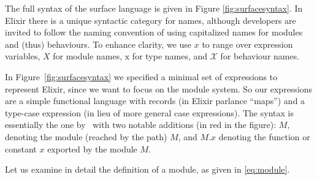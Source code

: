 \documentclass[a4paper,10pt]{article}
\newcommand{\tx}{\textrm{x}}
\begin{document}
The full syntax of the surface language is given in Figure \ref{fig:surfacesyntax}. In Elixir there is a unique syntactic category for names, although developers are invited to follow the naming convention of using capitalized names for modules and (thus) behaviours. To enhance clarity, we use $x$ to range over expression variables, $X$ for module names, $\tx$ for type names, and $\mathcal X$ for behaviour names. 

In Figure~\ref{fig:surfacesyntax} we specified a minimal set of expressions to represent Elixir, since we want to focus on the module system. So our expressions are a simple functional language with records (in Elixir parlance ``maps'') and a type-case expression (in lieu of more general case expressions). The syntax is essentially the one by~\cite{CDV24} with two notable additions (in red in the figure): $M$, denoting the module (reached by the path) $M$, and $M.x$ denoting the function or constant $x$ exported by the module $M$.

Let us examine in detail the definition of a module, as given in \eqref{eq:module}.
\end{document}
